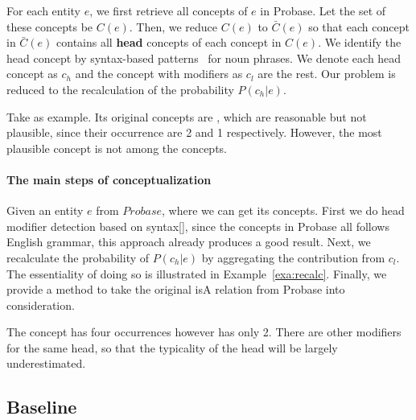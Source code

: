 For each entity $e$, we first retrieve all concepts of $e$ in Probase.
Let the set of these concepts be $C(e)$.
Then, we reduce $C(e)$ to $\bar{C}(e)$ so that each concept in $\bar{C}(e)$ contains all {\bf head} concepts of each concept in $C(e)$.
We identify the head concept by syntax-based patterns~\cite{ponzetto2007deriving} for noun phrases.
We denote each head concept as $c_h$ and the concept with modifiers as $c_{l}$ are the rest.
Our problem is reduced to the recalculation of the probability $P({c_h}|e)$.

\begin{example}
\label{exa:HvsO}
Take  as example. Its original concepts are , which are reasonable but not plausible, since their occurrence are 2 and 1 respectively. However, the most plausible concept  is not among the concepts.
\end{example}


\paragraph{The main steps of conceptualization}
Given an entity $e$ from $Probase$, where we can get its concepts.
First we do head modifier detection based on syntax[], since the concepts in Probase all follows English grammar, this approach already produces a good result.
Next, we recalculate the probability of $P({c_h}|e)$ by aggregating the contribution from $c_l$.
The essentiality of doing so is illustrated in Example~\ref{exa:recalc}.
Finally, we provide a method to take the original isA relation from Probase into consideration.

\begin{example}
\label{exa:recalc}
 The concept  has four occurrences however  has only 2. There are other modifiers for the same head, so that the typicality of the head will be largely underestimated.
\end{example}



\subsection{Baseline}

